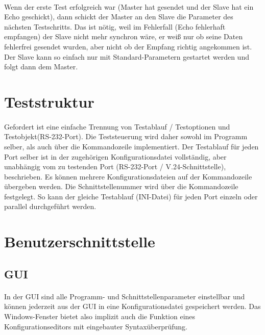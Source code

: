\paragraph{}
Wenn der erste Test erfolgreich war (Master hat gesendet und der Slave hat ein Echo geschickt), dann schickt der Master an den Slave die Parameter des nächsten Testschritts. Das ist nötig, weil im Fehlerfall (Echo fehlerhaft empfangen) der Slave nicht mehr synchron wäre, er weiß nur ob seine Daten fehlerfrei gesendet wurden, aber nicht ob der Empfang richtig angekommen ist. Der Slave kann so einfach nur mit Standard-Parametern gestartet werden und folgt dann dem Master.


\section{Teststruktur}
\paragraph{}
Gefordert ist eine einfache Trennung von Testablauf / Testoptionen  und  Testobjekt(RS-232-Port). Die Teststeuerung wird daher sowohl im Programm selber, als auch über die Kommandozeile implementiert. Der Testablauf für jeden Port selber ist in der zugehörigen Konfigurationsdatei vollständig, aber unabhängig vom zu testenden Port (RS-232-Port / V.24-Schnittstelle), beschrieben. Es können mehrere Konfigurationsdateien auf der Kommandozeile übergeben werden. Die Schnittstellenummer wird über die Kommandozeile festgelegt. So kann der gleiche Testablauf (INI-Datei) für jeden Port einzeln oder parallel durchgeführt werden.


\section{Benutzerschnittstelle}

\subsection{GUI}
\paragraph{}
In der GUI sind alle Programm- und Schnittstellenparameter einstellbar und können jederzeit aus der GUI in eine Konfigurationsdatei gespeichert werden. Das Windows-Fenster bietet also implizit auch die Funktion eines Konfigurationseditors mit eingebauter Syntaxüberprüfung.


